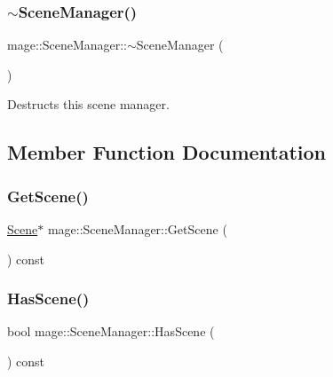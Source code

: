\subsubsection{\texorpdfstring{$\sim$\+Scene\+Manager()}{~SceneManager()}}
{\footnotesize\ttfamily mage\+::\+Scene\+Manager\+::$\sim$\+Scene\+Manager (\begin{DoxyParamCaption}{ }\end{DoxyParamCaption})\hspace{0.3cm}{\ttfamily [default]}}

Destructs this scene manager. 

\subsection{Member Function Documentation}
\hypertarget{classmage_1_1_scene_manager_a55d720c9f90cfc46dbf07d46537072c1}{}\label{classmage_1_1_scene_manager_a55d720c9f90cfc46dbf07d46537072c1} 
\subsubsection{\texorpdfstring{Get\+Scene()}{GetScene()}}
{\footnotesize\ttfamily \hyperlink{classmage_1_1_scene}{Scene}$\ast$ mage\+::\+Scene\+Manager\+::\+Get\+Scene (\begin{DoxyParamCaption}{ }\end{DoxyParamCaption}) const\hspace{0.3cm}{\ttfamily [noexcept]}}

\hypertarget{classmage_1_1_scene_manager_ac767593112ea1d8b47cc79283cf7c47e}{}\label{classmage_1_1_scene_manager_ac767593112ea1d8b47cc79283cf7c47e} 
\subsubsection{\texorpdfstring{Has\+Scene()}{HasScene()}}
{\footnotesize\ttfamily bool mage\+::\+Scene\+Manager\+::\+Has\+Scene (\begin{DoxyParamCaption}{ }\end{DoxyParamCaption}) const\hspace{0.3cm}{\ttfamily [noexcept]}}

\hypertarget{classmage_1_1_scene_manager_adeb1fd1d9f40229ccb0ef8adfb55f4cc}{}\label{classmage_1_1_scene_manager_adeb1fd1d9f40229ccb0ef8adfb55f4cc} 

